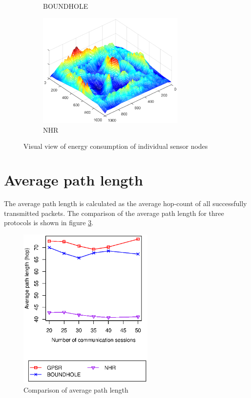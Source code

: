 \begin{figure}[!htb]
\begin{subfigure}{0.5\textwidth}
  \caption{BOUNDHOLE}
    \label{fig-3d-boundhole}
\end{subfigure}
\begin{subfigure}{0.5\textwidth}
  \centering
  \includegraphics[width=0.8\textwidth]{Chapter7/Chapter7Figs/nhr-energy.eps}
  \caption{NHR}
\end{subfigure}
\caption{Visual view of energy consumption of individual sensor nodes}
\label{fig-3d}
\end{figure}

\section{Average path length}
The average path length is calculated as the average hop-count of all successfully transmitted packets. The comparison of the average path length for three protocols is shown in figure \ref{fig-path-length}.

\begin{figure}[!htb]
  \centering
  \captionsetup{justification=centering}
  \includegraphics[width=0.6\textwidth]{Chapter7/Chapter7Figs/path.eps}
\caption{Comparison of average path length}
\label{fig-path-length}
\end{figure}

